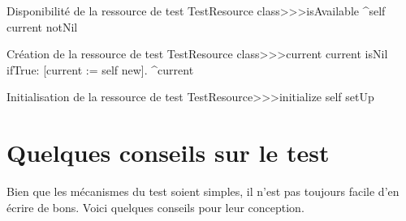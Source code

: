 \documentclass[a4paper,10pt,twoside]{book}
\begin{document}
{
\begin{method}[testresourceisavailable]{Disponibilité de la ressource de test}
TestResource class>>>isAvailable
	^self current notNil
\end{method}
\begin{method}[testresourcecurrent]{Création de la ressource de test}
TestResource class>>>current
	current isNil ifTrue: [current := self new].
	^current
\end{method}
\begin{method}[restresourceinitialize]{Initialisation de la ressource de test}
TestResource>>>initialize
	self setUp
\end{method}
\section{Quelques conseils sur le test}

Bien que les mécanismes du test soient simples, il n'est pas toujours
facile d'en écrire de bons.
Voici quelques conseils pour leur conception.

\begin{description}


\end{description}}
\end{document}
